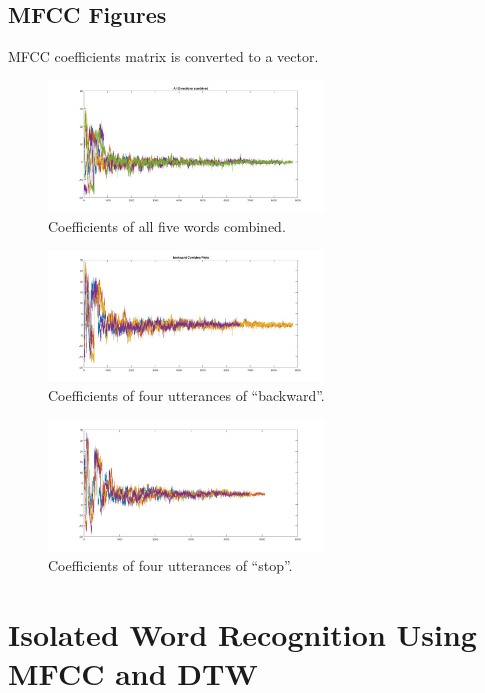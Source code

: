 \documentclass[12pt, a4paper, twoside]{report}
\begin{document}
\subsection{MFCC Figures}
MFCC coefficients matrix is converted to a vector.
\begin{figure}[!h]
	\centering
	\includegraphics[width=0.65\textwidth]
	{images/chapter5/gmmg-dir}
	\caption{Coefficients of all five words combined.}
	\label{fig:gmmg-dir}
\end{figure}
\begin{figure}[!h]
	\centering
	\includegraphics[width=0.65\textwidth]
	{images/chapter5/gmmg-back}
	\caption{Coefficients of four utterances of ``backward''.}
	\label{fig:gmmg-back}
\end{figure}
\begin{figure}[!h]
	\centering
	\includegraphics[width=0.65\textwidth]
	{images/chapter5/gmmg-stop}
	\caption{Coefficients of four utterances of ``stop''.}
	\label{fig:gmmg-stop}
\end{figure}

\section{Isolated Word Recognition Using MFCC and DTW}
\end{document}
